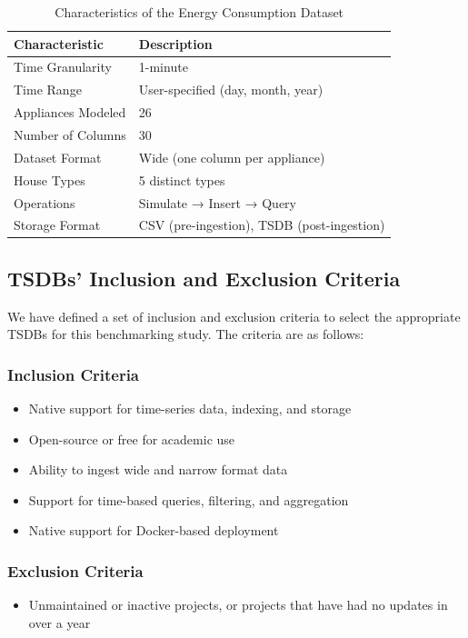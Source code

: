 \documentclass[conference]{IEEEtran}
\begin{document}
\begin{table}[tb]
\caption{Characteristics of the Energy Consumption Dataset}
\begin{center}
    \renewcommand{\arraystretch}{1.15}
\begin{tabular}{|l|l|}
\hline
\textbf{Characteristic} & \textbf{Description} \\
\hline
Time Granularity & 1-minute \\
Time Range & User-specified (day, month, year) \\
Appliances Modeled & 26 \\
Number of Columns & 30 \\
Dataset Format & Wide (one column per appliance) \\
House Types & 5 distinct types \\
Operations & Simulate → Insert → Query \\
Storage Format & CSV (pre-ingestion), TSDB (post-ingestion) \\
\hline
\end{tabular}
\label{tab:dataset_characteristics}
\end{center}
\end{table}

\subsection{TSDBs' Inclusion and Exclusion Criteria}
We have defined a set of inclusion and exclusion criteria to select the appropriate TSDBs for this benchmarking study. The criteria are as follows:
\subsubsection{Inclusion Criteria}
\begin{itemize}
    \item Native support for time-series data, indexing, and storage
    \item Open-source or free for academic use
    \item Ability to ingest wide and narrow format data
    \item Support for time-based queries, filtering, and aggregation
    \item Native support for Docker-based deployment
\end{itemize}
\subsubsection{Exclusion Criteria}
\begin{itemize}
    \item Unmaintained or inactive projects, or projects that have had no updates in over a year
\end{itemize}
\end{document}
